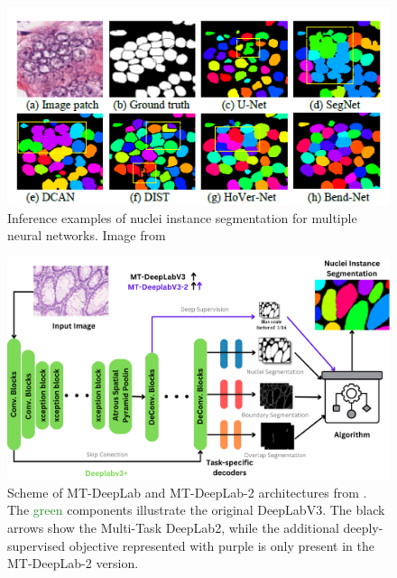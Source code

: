 \documentclass[conference]{IEEEtran}
\begin{document}
\begin{figure}[htb]
    \centering
	\centerline{\includegraphics[scale=0.85]{figures/bend_results.png}}
	\caption{Inference examples of nuclei instance segmentation for multiple neural networks. Image from \cite{wang2021bend}}
	\label{bend_results}
\end{figure}


\begin{figure}[htb]
    \centering
	\centerline{\includegraphics[scale=0.45]{figures/mt_deeplab_v2.png}}
	\caption{Scheme of MT-DeepLab and MT-DeepLab-2 architectures from \cite{rezazadeh2023multi}. The \textcolor{forestgreen}{green} components illustrate the original DeepLabV3. The black arrows show the Multi-Task DeepLab2, while the additional deeply-supervised objective represented with \textcolor{truepurple}{purple} is only present in the MT-DeepLab-2 version.}
	\label{mt_deeplab}
\end{figure}
\end{document}
